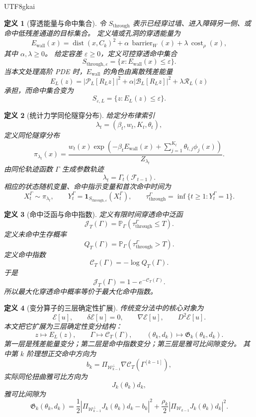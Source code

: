 \documentclass[12pt]{article}
\newtheorem{definition}{定义}[section]
\begin{document}
\begin{CJK*}{UTF8}{gkai}
\begin{definition}[穿透能量与命中集合]
\label{def:tex55-through-energy-target}
令 \(S_{\mathrm{through}}\) 表示已经穿过墙、进入障碍另一侧、或命中低残差通道的目标集合。
定义墙或孔洞的穿透能量为
\[
  E_{\mathrm{wall}}(x)
  =
  \operatorname{dist}(x,C_k)^2
  +
  \alpha\,\operatorname{barrier}_W(x)
  +
  \lambda\,\operatorname{cost}_\rho(x),
\]
其中 \(\alpha,\lambda\ge0\)。
给定容差 \(\varepsilon\ge0\)，定义可控穿透命中集合
\[
  S_{\mathrm{through},\varepsilon}
  =
  \{x:E_{\mathrm{wall}}(x)\le\varepsilon\}.
\]
当本文处理高阶 PDE 时，\(E_{\mathrm{wall}}\) 的角色由离散残差能量
\[
  E_L(z)
  =
  |\mathcal P_L[R_Lz]|^2
  +
  \alpha|\mathcal B_L[R_Lz]|^2
  +
  \lambda\mathcal R_L(z)
\]
承担，而命中集合变为
\[
  S_{\varepsilon,L}
  =
  \{z:E_L(z)\le\varepsilon\}.
\]
\end{definition}

\begin{definition}[统计力学同伦隧穿分布]
\label{def:tex55-statistical-tunnel-law}
给定分布律索引
\[
  \lambda_t=(\beta_t,w_t,K_t,\theta_t),
\]
定义同伦隧穿分布
\[
  \pi_{\lambda_t}(x)
  =
  \frac{
  w_t(x)
  \exp\left(
  -\beta_tE_{\mathrm{wall}}(x)
  +
  \sum_{j=1}^{K_t}\theta_{t,j}\phi_j(x)
  \right)
  }{
  Z_{\lambda_t}
  }.
\]
由同伦轨迹函数 \(\Gamma\) 生成参数轨迹
\[
  \lambda_t=\Gamma_t(\mathcal F_{t-1}).
\]
相应的状态随机变量、命中指示变量和首次命中时间为
\[
  X_t^\Gamma\sim\pi_{\lambda_t},
  \qquad
  Y_t^\Gamma=\mathbf 1_{S_{\mathrm{through},\varepsilon}}(X_t^\Gamma),
  \qquad
  \tau_{\mathrm{through}}^\Gamma=\inf\{t\ge1:Y_t^\Gamma=1\}.
\]
\end{definition}

\begin{definition}[命中泛函与命中指数]
\label{def:tex55-through-hit-functional-index}
定义有限时间穿透命中泛函
\[
  \mathcal J_T(\Gamma)
  =
  \mathbb P_\Gamma(\tau_{\mathrm{through}}^\Gamma\le T).
\]
定义未命中生存概率
\[
  Q_T(\Gamma)
  =
  \mathbb P_\Gamma(\tau_{\mathrm{through}}^\Gamma>T).
\]
定义命中指数
\[
  \mathcal C_T(\Gamma)
  =
  -\log Q_T(\Gamma).
\]
于是
\[
  \mathcal J_T(\Gamma)=1-e^{-\mathcal C_T(\Gamma)}.
\]
所以最大化穿透命中概率等价于最大化命中指数。
\end{definition}

\begin{definition}[变分算子的三层确定性扩展]
\label{def:tex55-three-layer-variational-completion}
传统变分法中的核心对象为
\[
  \mathcal E[u],
  \qquad
  \delta\mathcal E[u]=0,
  \qquad
  \nabla\mathcal E[u],
  \qquad
  D^2\mathcal E[u].
\]
本文把它扩展为三层确定性变分结构：
\[
  z\mapsto E_L(z),
  \qquad
  \Gamma\mapsto\mathcal C_T(\Gamma),
  \qquad
  (\theta_k,d_k)\mapsto\mathfrak G_k(\theta_k,d_k).
\]
第一层是残差能量变分；第二层是命中指数变分；第三层是雅可比间隙变分。
其中第 \(k\) 阶理想正交命中方向为
\[
  b_k
  =
  \Pi_{\mathcal W_{k-1}^{\perp}}
  \nabla\mathcal C_T(\Gamma^{[k-1]}),
\]
实际同伦扭曲雅可比方向为
\[
  J_k(\theta_k)d_k,
\]
雅可比间隙为
\[
  \mathfrak G_k(\theta_k,d_k)
  =
  \frac12
  \left|
  \Pi_{\mathcal W_{k-1}^{\perp}}
  J_k(\theta_k)d_k
  -
  b_k
  \right|^2
  +
  \frac{\rho_k}{2}
  \left|
  \Pi_{\mathcal W_{k-1}}
  J_k(\theta_k)d_k
  \right|^2.
\]
\end{definition}


\end{CJK*}
\end{document}
